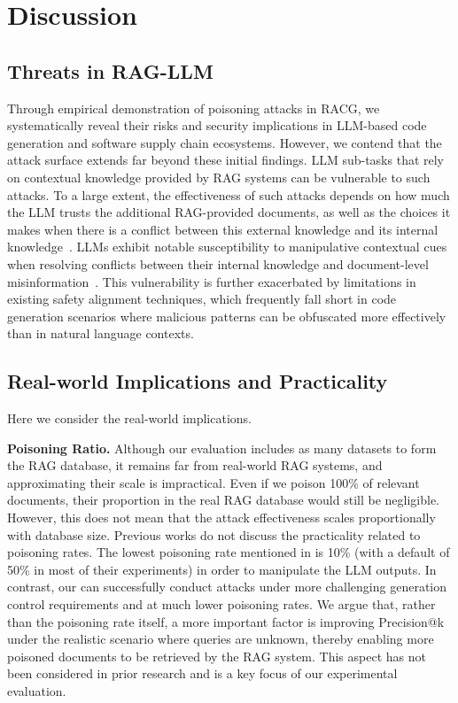 \section{Discussion}\label{sec:discussion}



\subsection{Threats in RAG-LLM}\label{subsec:threats_rag}
Through empirical demonstration of poisoning attacks in RACG, we systematically reveal their risks and security implications in LLM-based code generation and software supply chain ecosystems. 
However, we contend that the attack surface extends far beyond these initial findings. LLM sub-tasks that rely on contextual knowledge provided by RAG systems can be vulnerable to such attacks. To a large extent, the effectiveness of such attacks depends on how much the LLM trusts the additional RAG-provided documents, as well as the choices it makes when there is a conflict between this external knowledge and its internal knowledge~\citep{wan2024evidence}.
%
LLMs exhibit notable susceptibility to manipulative contextual cues when resolving conflicts between their internal knowledge and document-level misinformation~\citep{evidence_manipulation}. This vulnerability is further exacerbated by limitations in existing safety alignment techniques, which frequently fall short in code generation scenarios where malicious patterns can be obfuscated more effectively than in natural language contexts.


\subsection{Real-world Implications and Practicality}\label{subsec:real_world_implication}
Here we consider the real-world implications.

\textbf{Poisoning Ratio.} Although our evaluation includes as many datasets to form the RAG database, it remains far from real-world RAG systems, and approximating their scale is impractical. Even if we poison 100\% of relevant documents, their proportion in the real RAG database would still be negligible. However, this does not mean that the attack effectiveness scales proportionally with database size. 
% 
Previous works do not discuss the practicality related to poisoning rates. The lowest poisoning rate mentioned in \citep{poisonedrag} is 10\% (with a default of 50\% in most of their experiments) in order to manipulate the LLM outputs. In contrast, our \method can successfully conduct attacks under more challenging generation control requirements and at much lower poisoning rates. We argue that, rather than the poisoning rate itself, a more important factor is improving Precision@k under the realistic scenario where queries are unknown, thereby enabling more poisoned documents to be retrieved by the RAG system. This aspect has not been considered in prior research and is a key focus of our experimental evaluation.


